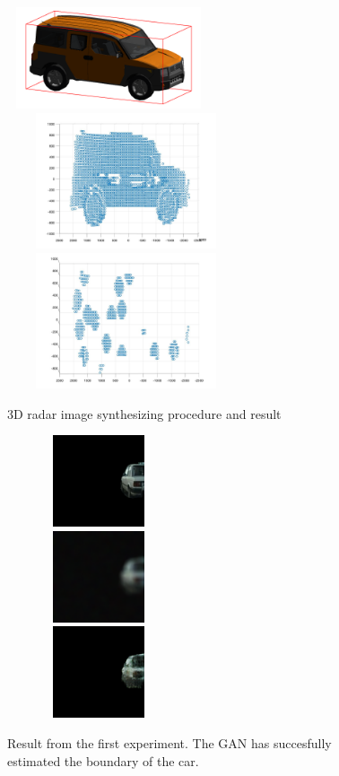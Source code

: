 \begin{figure}
	\centering
	\includegraphics[width=6cm,height=3cm]{./figure/CAD.png}\\
	\includegraphics[width=7cm,height=4cm]{./figure/side.jpg}\\
	\includegraphics[width=7cm,height=4cm]{./figure/specular.jpg}\\
	\caption{3D radar image synthesizing procedure and result}
	\label{3D_synth}
\end{figure}


\begin{figure}
	\centering
	\includegraphics[width=5.4cm, height=2.7cm]{./figure/126_real_B}\\
	\includegraphics[width=5.4cm, height=2.7cm]{./figure/126_real_A}\\
	\includegraphics[width=5.4cm, height=2.7cm]{./figure/126_fake_B}\\
	\caption{Result from the first experiment. The GAN has succesfully estimated the boundary of the car.}\label{fig1}
\end{figure}

